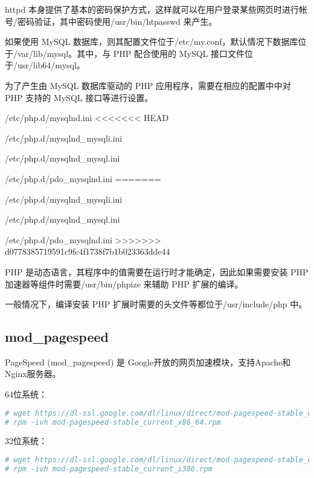 httpd 本身提供了基本的密码保护方式，这样就可以在用户登录某些网页时进行帐号/密码验证，其中密码使用/usr/bin/htpasswd 来产生。

如果使用 MySQL 数据库，则其配置文件位于/etc/my.conf，默认情况下数据库位于/var/lib/mysql。其中，与 PHP 配合使用的 MySQL 接口文件位于/usr/lib64/mysql。

为了产生由 MySQL 数据库驱动的 PHP 应用程序，需要在相应的配置中中对 PHP 支持的 MySQL 接口等进行设置。

\begin{compactitem}
\item /etc/php.d/mysqlnd.ini
<<<<<<< HEAD
\item /etc/php.d/mysqlnd_mysqli.ini
\item /etc/php.d/mysqlnd_mysql.ini
\item /etc/php.d/pdo_mysqlnd.ini
=======
\item /etc/php.d/mysqlnd\_mysqli.ini
\item /etc/php.d/mysqlnd\_mysql.ini
\item /etc/php.d/pdo\_mysqlnd.ini
>>>>>>> d0778385719591c9fc4f1738f7b1b023363dde44
\end{compactitem}

PHP 是动态语言，其程序中的值需要在运行时才能确定，因此如果需要安装 PHP 加速器等组件时需要/usr/bin/phpize 来辅助 PHP 扩展的编译。

一般情况下，编译安装 PHP 扩展时需要的头文件等都位于/usr/include/php 中。


\subsection{mod\_pagespeed}


PageSpeed (mod\_pagespeed) 是 Google开放的网页加速模块，支持Apache和Nginx服务器。 

64位系统：

\begin{lstlisting}[language=bash]
# wget https://dl-ssl.google.com/dl/linux/direct/mod-pagespeed-stable_current_x86_64.rpm
# rpm -ivh mod-pagespeed-stable_current_x86_64.rpm
\end{lstlisting}

32位系统：


\begin{lstlisting}[language=bash]
# wget https://dl-ssl.google.com/dl/linux/direct/mod-pagespeed-stable_current_i386.rpm
# rpm -ivh mod-pagespeed-stable_current_i386.rpm
\end{lstlisting}


